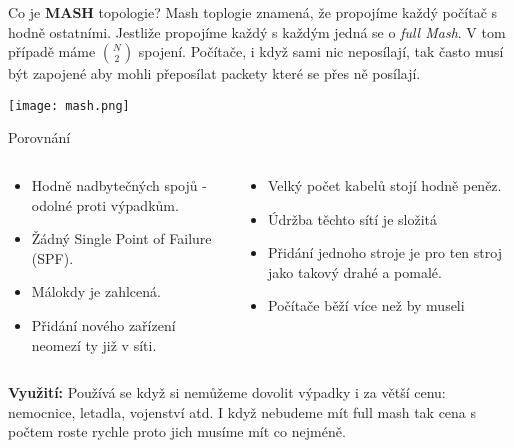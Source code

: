 \documentclass{beamer}
\begin{document}
\begin{frame}{Co je \textbf{MASH} topologie?}
 Mash toplogie znamená, že propojíme každý počítač s hodně ostatními. Jestliže
 propojíme každý s každým jedná se o \emph{full Mash}. V tom případě máme
$\binom{N}{2}$ spojení. Počítače, i když sami nic neposílají, tak často musí být
zapojené aby mohli přeposílat packety které se přes ně posílají.

 \texttt{[image: mash.png]}

\end{frame}
\begin{frame}{Porovnání}

\begin{columns}
    \begin{column}{0.45\textwidth}
        \begin{itemize}
            \item Hodně nadbytečných spojů - odolné proti výpadkům.
            \item Žádný Single Point of Failure (SPF). 
            \item Málokdy je zahlcená.
            \item Přidání nového zařízení neomezí ty již v síti.
        \end{itemize}
    \end{column}
    \begin{column}{0.45\textwidth}  %
        \begin{itemize}
            \item Velký počet kabelů stojí hodně peněz.
            \item Údržba těchto sítí je složitá
            \item Přidání jednoho stroje je pro ten stroj jako takový drahé a
             pomalé.
            \item Počítače běží více než by museli
        \end{itemize}
    \end{column}
    \end{columns}
    \vspace{10pt}

\textbf{Využití:} Používá se když si nemůžeme dovolit výpadky i za větší
cenu: nemocnice, letadla, vojenství atd. I když nebudeme mít full mash tak cena
s počtem roste rychle proto jich musíme mít co nejméně.
 
\end{frame}
\end{document}
